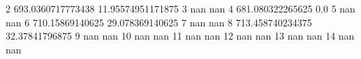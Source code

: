 2 693.0360717773438 11.95574951171875
3 nan nan
4 681.080322265625 0.0
5 nan nan
6 710.15869140625 29.078369140625
7 nan nan
8 713.458740234375 32.37841796875
9 nan nan
10 nan nan
11 nan nan
12 nan nan
13 nan nan
14 nan nan
